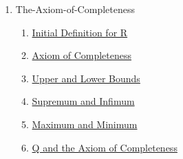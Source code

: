 \clearpage
\renewcommand{\notetitle}{Table of Contents}
\label{toc}
\begin{enumerate}

\item The-Axiom-of-Completeness
\begin{enumerate}
\item \hyperref[202501180703]{Initial Definition for R}
\item \hyperref[202501180727]{Axiom of Completeness}
\item \hyperref[202501180734]{Upper and Lower Bounds}
\item \hyperref[202501180743]{Supremum and Infimum}
\item \hyperref[202501181241]{Maximum and Minimum}
\item \hyperref[202501181257]{Q and the Axiom of Completeness}
\end{enumerate}
\end{enumerate}

\newpage
